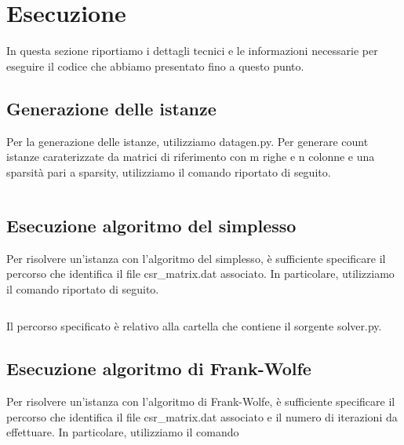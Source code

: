 \section{Esecuzione}

In questa sezione riportiamo i dettagli tecnici e le informazioni necessarie per eseguire il codice che abbiamo
presentato fino a questo punto.

\subsection{Generazione delle istanze}
Per la generazione delle istanze, utilizziamo {\jbm datagen.py}. Per generare {\jbm count} istanze caraterizzate da
matrici di riferimento con {\jbm m} righe e {\jbm n} colonne e una sparsità pari a {\jbm sparsity}, utilizziamo il
comando riportato di seguito.

\begin{inline}
\begin{lstlisting}[style=style2]
%\scalebox{0.7}{\faDollarSign}% python3 datagen.py <count> <m> <n> <sparsity>
\end{lstlisting}
\end{inline}

\subsection{Esecuzione algoritmo del simplesso}
Per risolvere un'istanza con l'algoritmo del simplesso, è sufficiente specificare il percorso che identifica il file
{\jbm csr\_matrix.dat} associato. In particolare, utilizziamo il comando riportato di seguito.
\begin{inline}
\begin{lstlisting}[style=style2]
%\scalebox{0.7}{\faDollarSign}% python3 solver.py <path/to/csr_matrix.dat>
\end{lstlisting}
\end{inline}
\noindent
Il percorso specificato è relativo alla cartella che contiene il sorgente {\jbm solver.py}.

\subsection{Esecuzione algoritmo di Frank-Wolfe}
Per risolvere un'istanza con l'algoritmo di Frank-Wolfe, è sufficiente specificare il percorso che identifica il file
{\jbm csr\_matrix.dat} associato e il numero di iterazioni da effettuare. In particolare, utilizziamo il comando
\begin{inline}
\begin{lstlisting}[style=style2]
%\scalebox{0.7}{\faDollarSign}% gcc solver.c -o solver -Ofast
\end{lstlisting}
\end{inline}

